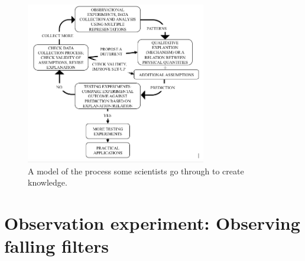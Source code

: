 
\begin{figure}
	\centering
	\includegraphics[width=0.7\textwidth]{measurement/islegraphic.png}
	\caption{A model of the process some scientists go through to create knowledge.\cite{etkina_millikan_2015}}\label{me:fig:isle}
\end{figure}

\section*{Observation experiment: Observing falling filters}

